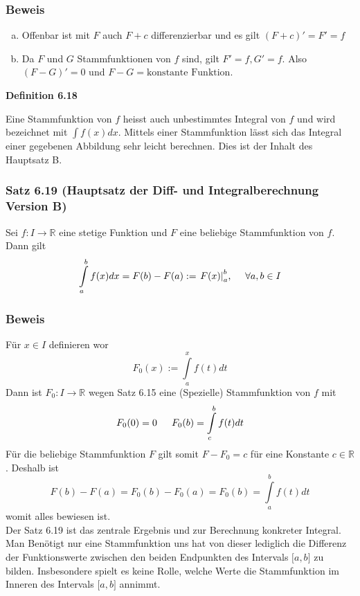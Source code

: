 \subsubsection*{Beweis}
\begin{enumerate}[(a)]
\item Offenbar ist mit $F$ auch $F+c$ differenzierbar und es gilt $(F+c)'=F'=f$
\item Da $F$ und $G$ Stammfunktionen von $f$ sind, gilt $F'=f, G'=f$. Also $(F-G)'=0$ und $F-G=\text{konstante Funktion}$. 
\end{enumerate}

\begin{framed}
\centerline{\textbf{Definition 6.18}}
\noindent Eine Stammfunktion von $f$ heisst auch unbestimmtes Integral von $f$ und wird bezeichnet mit $\int {f(x)dx} $. Mittels einer Stammfunktion lässt sich das Integral einer gegebenen Abbildung sehr leicht berechnen. Dies ist der Inhalt des Hauptsatz B.\\
\end{framed}
\subsubsection*{Satz 6.19 (Hauptsatz der Diff- und Integralberechnung Version B)}
Sei $f:I\rightarrow\mathbb{R}$ eine stetige Funktion und $F$ eine beliebige Stammfunktion von $f$. Dann gilt \[\int\limits_a^b {f(x)dx = F(b) - F(a): = \left. {F(x)} \right|_a^b}\text{,\indent}\forall a,b\in I \]

\subsubsection*{Beweis}
Für $x\in I$ definieren wor $$F_0(x):=\int\limits_a^x {f(t)dt} $$
Dann ist $F_0:I\rightarrow\mathbb{R}$ wegen Satz 6.15 eine (Spezielle) Stammfunktion von $f$ mit \[{F_0}(0) = 0\text{\indent}{F_0}(b) = \int\limits_c^b {f(t)dt} \]
Für die beliebige Stammfunktion $F$ gilt somit $F-F_0=c$ für eine Konstante $c\in\mathbb{R}$. Deshalb ist \[F(b) - F(a) = {F_0}(b) - {F_0}(a) = {F_0}(b) = \int\limits_a^b {f(t)dt} \] womit alles bewiesen ist. \\

Der Satz 6.19 ist das zentrale Ergebnis und zur Berechnung konkreter Integral. Man Benötigt nur eine Stammfunktion uns hat von dieser lediglich die Differenz der Funktionswerte zwischen den beiden Endpunkten des Intervals $\lbrack a,b\rbrack$ zu bilden. 
Insbesondere spielt es keine Rolle, welche Werte die Stammfunktion im Inneren des Intervals  $\lbrack a,b\rbrack$ annimmt.
